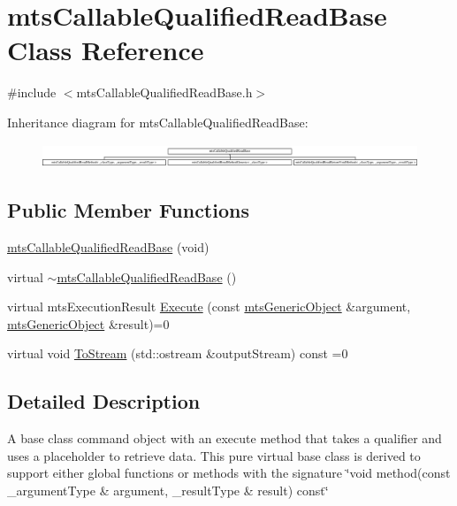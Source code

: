 \hypertarget{classmts_callable_qualified_read_base}{}\section{mts\+Callable\+Qualified\+Read\+Base Class Reference}
\label{classmts_callable_qualified_read_base}


{\ttfamily \#include $<$mts\+Callable\+Qualified\+Read\+Base.\+h$>$}

Inheritance diagram for mts\+Callable\+Qualified\+Read\+Base\+:\begin{figure}[H]
\begin{center}
\leavevmode
\includegraphics[height=0.707071cm]{d3/db4/classmts_callable_qualified_read_base}
\end{center}
\end{figure}
\subsection*{Public Member Functions}
\begin{DoxyCompactItemize}
\item 
\hyperlink{classmts_callable_qualified_read_base_aadb5cb44dcc5b7bb3ef8c3a9ff56afc3}{mts\+Callable\+Qualified\+Read\+Base} (void)
\item 
virtual \hyperlink{classmts_callable_qualified_read_base_a6f8d3595fd5fb8daa555325c79266e29}{$\sim$mts\+Callable\+Qualified\+Read\+Base} ()
\item 
virtual mts\+Execution\+Result \hyperlink{classmts_callable_qualified_read_base_aca2bad9e0f6976b8ca2207f67358cbf2}{Execute} (const \hyperlink{classmts_generic_object}{mts\+Generic\+Object} \&argument, \hyperlink{classmts_generic_object}{mts\+Generic\+Object} \&result)=0
\item 
virtual void \hyperlink{classmts_callable_qualified_read_base_af01602ea4eb94bf074f6e44ff3db2737}{To\+Stream} (std\+::ostream \&output\+Stream) const =0
\end{DoxyCompactItemize}


\subsection{Detailed Description}
A base class command object with an execute method that takes a qualifier and uses a placeholder to retrieve data. This pure virtual base class is derived to support either global functions or methods with the signature \char`\"{}void method(const \+\_\+argument\+Type \&
argument, \+\_\+result\+Type \& result) const\char`\"{} 

